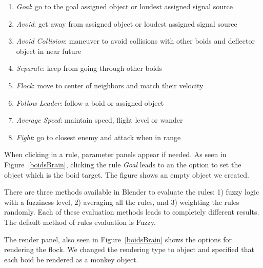 \begin{enumerate}
\item{\textit{Goal}: go to the goal assigned object or loudest assigned signal source}
\item{\textit{Avoid}: get away from assigned object or loudest assigned signal source}
\item{\textit{Avoid Collision}: maneuver to avoid collisions with other boids and deflector object in near future}
\item{\textit{Separate}: keep from going through other boids}
\item{\textit{Flock}: move to center of neighbors and match their velocity}
\item{\textit{Follow Leader}: follow a boid or assigned object}
\item{\textit{Average Speed}: maintain speed, flight level or wander}
\item{\textit{Fight}: go to closest enemy and attack when in range}
\end{enumerate}

When clicking in a rule, parameter panels appear if needed. As seen in Figure~\ref{boidsBrain}, clicking the rule \textit{Goal} leads to an the option to set the object which is the boid target. The figure shows an empty object we created. 

There are three methods available in Blender to evaluate the rules: 1) fuzzy logic with a fuzziness level, 2) averaging all the rules, and 3) weighting the rules randomly. Each of these evaluation methods leads to completely different results. The default method of rules evaluation is Fuzzy.

The render panel, also seen in Figure~\ref{boidsBrain} shows the options for rendering the flock. We changed the rendering type to object and specified that each boid be rendered as a monkey object.


